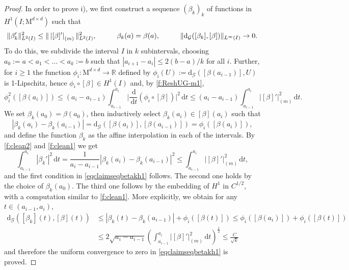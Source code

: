 \documentclass[a4paper,reqno]{amsart}
\newcommand\R{\mathbb{R}}
\newcommand{\dG}{\mathrm{d}_{\G}}
\newcommand\di{{\,\mathrm{d}}}
\newcommand\dt{{\,\mathrm{d}t}}
\theoremstyle{remark}
\newcommand{\G}{\mathcal{G}}
\numberwithin{equation}{section}
\begin{document}
\begin{proof}
In order to prove i),  we first construct a sequence $(\beta_k)_k$ of functions in $H^1(I;\mathrm{M}^{d\times d})$ such that
	\begin{equation}\label{eqclaimseqbetakh1}
		\| \beta'_k\|_{L^2(I)}^2 \le \| \left|[\beta]'\right|_{(m)}\|_{L^2(I)}^2, \hskip1cm 
		\beta_k(a)=\beta(a)
		, \hskip1cm 
		\|\dG([\beta_k],[\beta])\|_{L^\infty(I)}\to0. 
	\end{equation}
	To do this, 
	we subdivide the interval $I$ in $k$ subintervals, choosing $a_0:=a<a_1<\dots <a_k:=b$
	such that $|a_{i+1}-a_i|\le 2 (b-a)/k$ for all $i$. 
	Further, for $i\ge 1$
	the function 
$\phi_i:\mathrm{M}^{d\times d}\to\R$ defined by
$\phi_i( U):=\dG([\beta(a_{i-1})],  U)$
	is 1-Lipschitz, hence $ \phi_i\circ [\beta]\in H^1(I)$ and, 
	by \eqref{f:ReshUG-m1},
	\begin{equation}\label{f:clean1}
		\phi_i^2([\beta(a_i)])
		\le (a_i-a_{i-1})
		\int_{a_{i-1}}^{a_i} \Big|\frac{\di}{\dt} (\phi_i\circ [\beta])\Big|^2 \dt
		\le (a_i-a_{i-1})
		\int_{a_{i-1}}^{a_i} | [\beta]'|_{(m)}^2\dt.
	\end{equation}
	We set $\beta_k(a_0)=\beta(a_0)$, then inductively select $\beta_k(a_i)\in [\beta](a_i)$ 
	such that
	\begin{equation}\label{f:clean2}
		|\beta_k(a_i)-\beta_k(a_{i-1})|=
		\dG([\beta(a_i)],[\beta(a_{i-1})])=\phi_i([\beta(a_i)]),
	\end{equation}
	and define the function $\beta_k$ as the affine interpolation in each of the intervals. 
	By \eqref{f:clean2} and \eqref{f:clean1} we get
	\begin{equation}\label{f:clean3}
		\int_{a_{i-1}}^{a_i} |\beta_k'|^2 \dt
		=\frac1{a_i-a_{i-1}} |\beta_k(a_i)-\beta_k(a_{i-1})|^2\le \int_{a_{i-1}}^{a_i} | [\beta]'|_{(m)}^2\dt,
	\end{equation}
	and the first condition in \eqref{eqclaimseqbetakh1} follows. The second one holds by the choice of $\beta_k(a_0)$. The third one follows by the embedding of $H^1$ in $C^{1/2}$, with a computation similar to \eqref{f:clean1}. More explicitly, we obtain for any $t\in (a_{i-1},a_i)$, 
	\[
	\begin{split}
\dG([\beta_k](t),[\beta](t))
		& \le |\beta_k(t)-\beta_k(a_{i-1})|+
		\phi_i([\beta(t)]) \leq  	\phi_i([\beta(a_i)])+ 	\phi_i([\beta(t)])\\
		& \le 2 \sqrt{a_i-a_{i-1}}\left(\int_{a_{i-1}}^{a_i} |[\beta]'|_{(m)}^2\dt\right)^{\frac12} \leq \frac{C}{\sqrt{k}} 
	\end{split}
	\]
	and therefore the uniform convergence  to zero in  \eqref{eqclaimseqbetakh1} is proved.
	

\end{proof}
\end{document}
